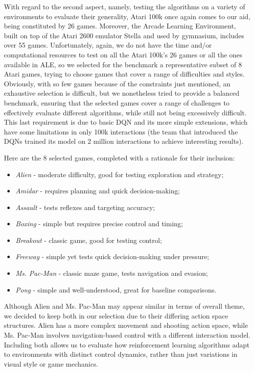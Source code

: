 With regard to the second aspect, namely, testing the algorithms on a variety of environments to evaluate their generality, Atari 100k once again comes to our aid, being constituted by 26 games. Moreover, the Arcade Learning Environment, built on top of the Atari 2600 emulator Stella and used by gymnasium, includes over 55 games. Unfortunately, again, we do not have the time and/or computational resources to test on all the Atari \num{100}k's 26 games or all the ones available in ALE, so we selected for the benchmark a representative subset of 8 Atari games, trying to choose games that cover a range of difficulties and styles. Obviously, with so few games because of the constraints just mentioned, an exhaustive selection is difficult, but we nonetheless tried to provide a balanced benchmark, ensuring that the selected games cover a range of challenges to effectively evaluate different algorithms, while still not being excessively difficult. This last requirement is due to basic DQN and its more simple extensions, which have some limitations in only 100k interactions (the team that introduced the DQNs trained its model on 2 million interactions to achieve interesting results).

Here are the 8 selected games, completed with a rationale for their inclusion:
\begin{itemize}
	\item \textit{Alien} - moderate difficulty, good for testing exploration and strategy;
	\item \textit{Amidar} - requires planning and quick decision-making;
	\item \textit{Assault} - tests reflexes and targeting accuracy;
	\item \textit{Boxing} - simple but requires precise control and timing;
	\item \textit{Breakout} - classic game, good for testing control;
	\item \textit{Freeway} - simple yet tests quick decision-making under pressure;
	\item \textit{Ms. Pac-Man} - classic maze game, tests navigation and evasion;
	\item \textit{Pong} - simple and well-understood, great for baseline comparisons.
\end{itemize}
Although Alien and Ms. Pac-Man may appear similar in terms of overall theme, we decided to keep both in our selection due to their differing action space structures. Alien has a more complex movement and shooting action space, while Ms. Pac-Man involves navigation-based control with a different interaction model. Including both allows us to evaluate how reinforcement learning algorithms adapt to environments with distinct control dynamics, rather than just variations in visual style or game mechanics.

